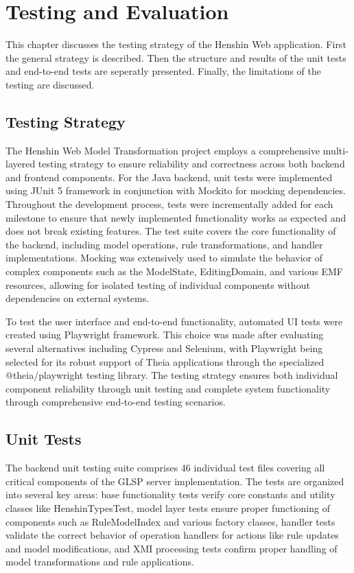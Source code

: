 \chapter{Testing and Evaluation}
  \label{sec:testing}

  This chapter discusses the testing strategy of the Henshin Web application. First the general strategy is described. Then the structure and results of the unit tests and end-to-end tests are seperatly presented. Finally, the limitations of the testing are discussed.

  
  \section{Testing Strategy}
  \label{subsec:testing-strategy}


The Henshin Web Model Transformation project employs a comprehensive multi-layered testing strategy to ensure reliability and correctness across both backend and frontend components. For the Java backend, unit tests were implemented using JUnit 5 framework in conjunction with Mockito for mocking dependencies. Throughout the development process, tests were incrementally added for each milestone to ensure that newly implemented functionality works as expected and does not break existing features. The test suite covers the core functionality of the backend, including model operations, rule transformations, and handler implementations. Mocking was extensively used to simulate the behavior of complex components such as the ModelState, EditingDomain, and various EMF resources, allowing for isolated testing of individual components without dependencies on external systems.

To test the user interface and end-to-end functionality, automated UI tests were created using Playwright framework. This choice was made after evaluating several alternatives including Cypress and Selenium, with Playwright being selected for its robust support of Theia applications through the specialized @theia/playwright testing library. The testing strategy ensures both individual component reliability through unit testing and complete system functionality through comprehensive end-to-end testing scenarios.

  \section{Unit Tests}
  \label{subsec:test-results}


The backend unit testing suite comprises 46 individual test files covering all critical components of the GLSP server implementation. The tests are organized into several key areas: base functionality tests verify core constants and utility classes like HenshinTypesTest, model layer tests ensure proper functioning of components such as RuleModelIndex and various factory classes, handler tests validate the correct behavior of operation handlers for actions like rule updates and model modifications, and XMI processing tests confirm proper handling of model transformations and rule applications.

